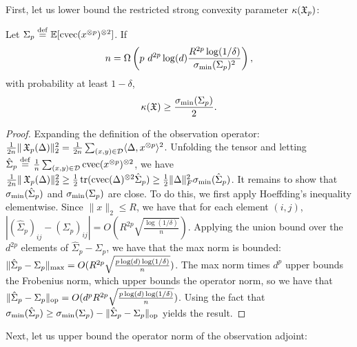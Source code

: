 
First, let us lower bound the restricted strong convexity parameter $\kappa(\operatorname{\mathfrak{X}}_p)$:

\begin{lemma}
\label{lem:lowRankLower}
Let $\Sigma_p \stackrel{\rm def}{=} \operatorname{\mathbb{E}}[\operatorname{cvec}(x^{\otimes p})^{\otimes 2}]$.
If $$n = \Omega \left( p ~ d^{2p} \log(d) \frac{R^{2p} \log(1/\delta)}{\sigma_\text{\rm min}(\Sigma_p)^2} \right),$$
with probability at least $1-\delta$,
$$\kappa(\operatorname{\mathfrak{X}}) \ge \frac{\sigma_\text{\rm min}(\Sigma_p)}{2}.$$
\end{lemma}
\begin{proof}
Expanding the definition of the observation operator:
$\frac{1}{2n} \|\operatorname{\mathfrak{X}}_p(\Delta)\|_2^2
= \frac{1}{2n} \sum_{(x,y) \in \mathcal{D}} \langle \Delta, x^{\otimes p} \rangle^2$.
Unfolding the tensor and letting $\hat\Sigma_p \stackrel{\rm def}{=} \frac{1}{n} \sum_{(x,y) \in \mathcal{D}} \operatorname{cvec}(x^{\otimes p})^{\otimes 2}$,
we have 
$\frac{1}{2n} \|\operatorname{\mathfrak{X}}_p(\Delta)\|_2^2
\ge \frac{1}{2} \operatorname{tr}(\operatorname{cvec}(\Delta)^{\otimes 2} \hat\Sigma_p)
\ge \frac{1}{2} \|\Delta\|_F^2 \sigma_\text{\rm min}(\hat\Sigma_p)$.
It remains to show that $\sigma_\text{\rm min}(\hat\Sigma_p)$ and $\sigma_\text{\rm min}(\Sigma_p)$ are close.
To do this, we first apply Hoeffding's inequality elementwise.
Since $\|x\|_2 \le R$, we have that for each element $(i,j)$,
$|(\hat\Sigma_p)_{ij} - (\Sigma_p)_{ij}| = O(R^{2p}\sqrt{\frac{\log (1/\delta)}{n}})$.
Applying the union bound over the $d^{2p}$ elements of $\hat\Sigma_p - \Sigma_p$,
we have that the max norm is bounded:
$\|\hat\Sigma_p - \Sigma_p\|_\text{\rm max} = O(R^{2p} \sqrt{\frac{p \log(d) \log (1/\delta)}{n}})$.
The max norm times $d^p$ upper bounds the Frobenius norm, which upper bounds the operator norm, so we have that
$\|\hat\Sigma_p - \Sigma_p\|_\text{\rm op} = O(d^p R^{2p} \sqrt{\frac{p \log(d) \log (1/\delta)}{n}})$.
Using the fact that $\sigma_\text{\rm min}(\hat\Sigma_p) \ge \sigma_\text{\rm min}(\Sigma_p) - \|\hat\Sigma_p - \Sigma_p\|_\text{\rm op}$
yields the result.
\end{proof}

Next, let us upper bound the operator norm of the observation adjoint:

